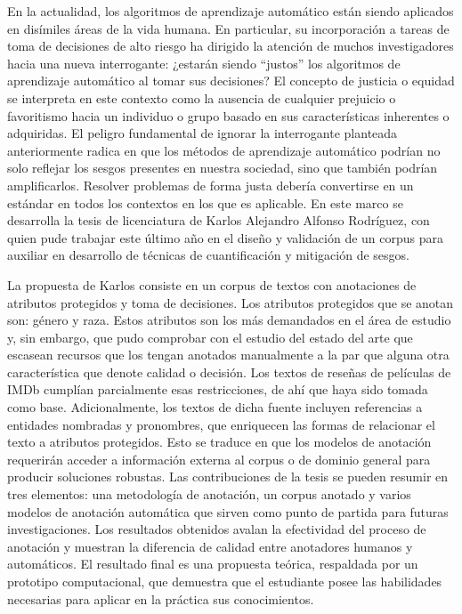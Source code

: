 \begin{opinion}

En la actualidad, los algoritmos de aprendizaje automático están siendo aplicados en disímiles áreas de la vida humana. En particular, su incorporación a tareas de toma de decisiones de alto riesgo ha dirigido la atención de muchos investigadores hacia una nueva interrogante: ¿estarán siendo ``justos'' los algoritmos de aprendizaje automático al tomar sus decisiones? El concepto de justicia o equidad se interpreta en este contexto como la ausencia de cualquier prejuicio o favoritismo hacia un individuo o grupo basado en sus características inherentes o adquiridas. El peligro fundamental de ignorar la interrogante planteada anteriormente radica en que los métodos de aprendizaje automático podrían no solo reflejar los sesgos presentes en nuestra sociedad, sino que también podrían amplificarlos. Resolver problemas de forma justa debería convertirse en un estándar en todos los contextos en los que es aplicable. En este marco se desarrolla la tesis de licenciatura de Karlos Alejandro Alfonso Rodríguez, con quien pude trabajar este último año en el diseño y validación de un corpus para auxiliar en desarrollo de técnicas de cuantificación y mitigación de sesgos.

La propuesta de Karlos consiste en un corpus de textos con anotaciones de atributos protegidos y toma de decisiones. Los atributos protegidos que se anotan son: género y raza. Estos atributos son los más demandados en el área de estudio y, sin embargo, que pudo comprobar con el estudio del estado del arte que escasean recursos que los tengan anotados manualmente a la par que alguna otra característica que denote calidad o decisión. Los textos de reseñas de películas de IMDb cumplían parcialmente esas restricciones, de ahí que haya sido tomada como base. Adicionalmente, los textos de dicha fuente incluyen referencias a entidades nombradas y pronombres, que enriquecen las formas de relacionar el texto a atributos protegidos. Esto se traduce en que los modelos de anotación requerirán acceder a información externa al corpus o de dominio general para producir soluciones robustas. Las contribuciones de la tesis se pueden resumir en tres elementos: una metodología de anotación, un corpus anotado y varios modelos de anotación automática que sirven como punto de partida para futuras investigaciones. Los resultados obtenidos avalan la efectividad del proceso de anotación y muestran la diferencia de calidad entre anotadores humanos y automáticos. El resultado final es una propuesta teórica, respaldada por un prototipo computacional, que demuestra que el estudiante posee las habilidades necesarias para aplicar en la práctica sus conocimientos. 


\end{opinion}
